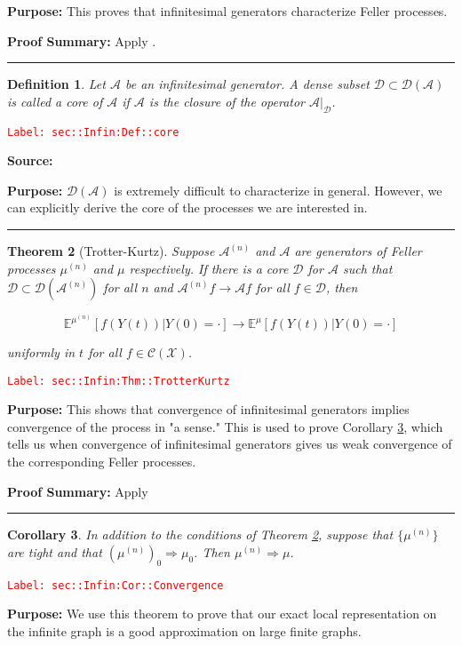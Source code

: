 \documentclass[12pt]{article}
\newcommand{\mb}{\mathbb}
\newcommand{\mc}{\mathcal}
\newcommand{\ra}{\rightarrow}
\newcommand{\tr}{\textcolor{red}}
\newcommand{\labe}[1]{\tr{\texttt{Label: #1}}}
\newcommand{\purpose}{\textbf{Purpose: }}
\newcommand{\pfsum}{\textbf{Proof Summary: }}
\newcommand{\lin}{\rule{\linewidth}{0.4 pt}}
\newcommand{\exmu}[2]{\mb{E}^{#1}\left[#2\right]}	%
\renewcommand{\t}{t}							%
\newcommand{\IG}{\mc{A}}						%
\newcommand{\tp}[1]{(#1)}						%
\newcommand{\ts}[1]{_{#1}}						%
\newcommand{\sln}[1]{^{(#1)}}					%
\newcommand{\core}{\mc{D}}						%
\newcommand{\cont}{\mc{C}}						%
\newcommand{\m}{\mu}							%
\newcommand{\XX}{Y}								%
\newcommand{\spce}{\mc{X}}						%
\newtheorem{thms}{Theorem}[section]
\newtheorem{coro}[thms]{Corollary}
\newtheorem{defn}[thms]{Definition}
\begin{document}
\purpose This proves that infinitesimal generators characterize Feller processes.

\pfsum Apply \cite[Theorem 1.5,2.9]{Lig85}.

\lin

\begin{defn}
Let \(\IG\) be an infinitesimal generator. A dense subset \(\core\subset \core(\IG)\) is called a core of \(\IG\) if \(\IG\) is the closure of the operator \(\IG|_\core\).
\label{sec::Infin:Def::core}
\end{defn}
\labe{sec::Infin:Def::core}

\textbf{Source: }\cite[Definition 2.11]{Lig85}

\purpose \(\core(\IG)\) is extremely difficult to characterize in general. However, we can explicitly derive the core of the processes we are interested in.

\lin

\begin{thms}[Trotter-Kurtz]
Suppose \(\IG\sln{n}\) and \(\IG\) are generators of Feller processes \(\m\sln{n}\) and \(\m\) respectively. If there is a core \(\core\) for \(\IG\) such that \(\core \subset \mc{D}(\IG\sln{n})\) for all \(n\) and \(\IG\sln{n} f \ra \IG f\) for all \(f \in \core\), then 

\[\exmu{\m\sln{n}}{f(\XX\tp{\t})|\XX\tp{0}=\cdot} \ra \exmu{\mu}{f(\XX\tp{\t})|\XX\tp{0}=\cdot}\]

uniformly in \(\t\) for all \(f \in \cont(\spce)\).
\label{sec::Infin:Thm::TrotterKurtz}
\end{thms}
\labe{sec::Infin:Thm::TrotterKurtz}

\purpose This shows that convergence of infinitesimal generators implies convergence of the process in "a sense." This is used to prove Corollary \ref{sec::Infin:Cor::Convergence}, which tells us when convergence of infinitesimal generators gives us weak convergence of the corresponding Feller processes.

\pfsum Apply \cite[Theorem 2.12]{Lig85}

\lin

\begin{coro}
In addition to the conditions of Theorem \ref{sec::Infin:Thm::TrotterKurtz}, suppose that \(\{\m\sln{n}\}\) are tight and that \((\m\sln{n})\ts{0} \Rightarrow \m\ts{0}\). Then \(\m\sln{n} \Rightarrow \m\).
\label{sec::Infin:Cor::Convergence}
\end{coro}
\labe{sec::Infin:Cor::Convergence}

\purpose We use this theorem to prove that our exact local representation on the infinite graph is a good approximation on large finite graphs.
\end{document}

